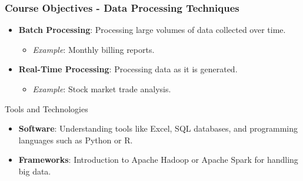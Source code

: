 \documentclass[aspectratio=169]{beamer}
\begin{document}
\begin{frame}[fragile]
    \frametitle{Course Objectives - Data Processing Techniques}
    \begin{itemize}
        \item \textbf{Batch Processing}: Processing large volumes of data collected over time.
            \begin{itemize}
                \item \textit{Example}: Monthly billing reports.
            \end{itemize}
        \item \textbf{Real-Time Processing}: Processing data as it is generated.
            \begin{itemize}
                \item \textit{Example}: Stock market trade analysis.
            \end{itemize}
    \end{itemize}
    
    \begin{block}{Tools and Technologies}
        \begin{itemize}
            \item \textbf{Software}: Understanding tools like Excel, SQL databases, and programming languages such as Python or R.
            \item \textbf{Frameworks}: Introduction to Apache Hadoop or Apache Spark for handling big data.
        \end{itemize}
    \end{block}
\end{frame}
\end{document}
